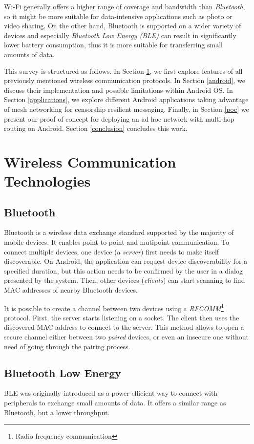 \documentclass[conference,compsoc]{IEEEtran}
\begin{document}
Wi-Fi generally offers a higher range of coverage and bandwidth than \textit{Bluetooth}, so it might be more suitable for data-intensive applications such as photo or video sharing. On the other hand, Bluetooth is supported on a wider variety of devices and especially \textit{Bluetooth Low Energy (BLE)} \cite{android:ble} can result in significantly lower battery consumption, thus it is more suitable for transferring small amounts of data.

This survey is structured as follows. In Section \ref{wirelesstech}, we first explore features of all previously mentioned wireless communication protocols. In Section \ref{android}, we discuss their implementation and possible limitations within Android OS. In Section \ref{applications}, we explore different Android applications taking advantage of mesh networking for censorship resilient messaging. Finally, in Section \ref{poc} we present our proof of concept for deploying an ad hoc network with multi-hop routing on Android. Section \ref{conclusion} concludes this work.

\section{Wireless Communication Technologies} \label{wirelesstech}

\subsection{Bluetooth}
Bluetooth is a wireless data exchange standard supported by the majority of mobile devices. It enables point to point and mutipoint communication. 
To connect multiple devices, one device (a \textit{server}) first needs to make itself discoverable. On Android, the application can request device discoverability for a specified duration, but this action needs to be confirmed by the user in a dialog presented by the system. Then, other devices (\textit{clients}) can start scanning to find MAC addresses of nearby Bluetooth devices.

It is possible to create a channel between two devices using a \textit{RFCOMM}\footnote{Radio frequency communication} protocol. First, the server starts listening on a socket. The client then uses the discovered MAC address to connect to the server. This method allows to open a secure channel either between two \textit{paired} devices, or even an insecure one without need of going through the pairing process.

\subsection{Bluetooth Low Energy}
BLE was originally introduced as a power-efficient way to connect with peripherals to exchange small amounts of data. It offers a similar range as Bluetooth, but a lower throughput.
\end{document}
